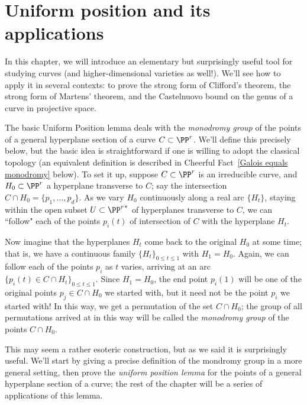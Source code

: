 


\chapter{Uniform position and its applications}\label{uniform position}

In this chapter, we will introduce an elementary but surprisingly useful tool for studying curves (and higher-dimensional varieties as well!). We'll see how to apply it in several contexts: to prove the strong form of Clifford's theorem, the strong form of Martens' theorem, and the Castelnuovo bound on the genus of a curve in projective space.

The basic Uniform Position lemma deals with the \emph{monodromy group} of the points of a general hyperplane section of a curve $C \subset \PP^r$. We'll define this precisely below, but the basic idea is straightforward if one is willing to adopt the classical topology (an equivalent definition is described in Cheerful Fact~\ref{Galois equals monodromy} below). To set it up, suppose $C \subset \PP^r$ is an irreducible curve, and $H_0 \subset \PP^r$ a hyperplane transverse to $C$; say the intersection $C \cap H_0 = \{p_1,\dots,p_d\}$. As we vary $H_0$ continuously along a real arc $\{H_t\}$, staying within the open subset $U \subset {\PP^r}^*$ of hyperplanes transverse to $C$, we can ``follow" each of the points $p_i(t)$ of intersection of $C$ with the hyperplane $H_t$.

Now imagine that the hyperplanes $H_t$ come back to the original $H_0$ at some time; that is, we have a continuous family $\{H_t\}_{0 \leq t \leq 1}$ with $H_1 = H_0$. Again, we can follow each of the points $p_i$ as $t$ varies, arriving at an arc $\{p_i(t) \in C \cap H_t\}_{0 \leq t \leq 1}$. Since $H_1 = H_0$, the end point $p_i(1)$ will be one of the original points $p_j \in C \cap H_0$ we started with, but it need not be the point $p_i$ we started with! In this way, we get a permutation of the set $C \cap H_0$; the group of all permutations arrived at in this way will be called the \emph{monodromy group} of the points $C \cap H_0$. 

This may seem a rather esoteric construction, but as we said it is surprisingly useful. We'll start by giving a precise definition of the mondromy group in a more general setting, then prove the \emph{uniform position lemma} for the points of a general hyperplane section of a curve; the rest of the chapter will be a series of applications of this lemma.

